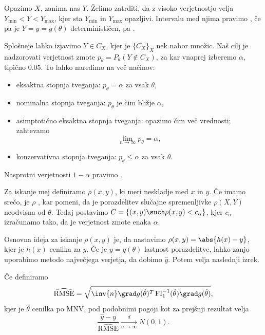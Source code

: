 
Opazimo $X$, zanima nas $Y$.
Želimo zatrditi, da z visoko verjetnostjo velja $Y_{\text{min}} < Y <
Y_{\text{max}}$, kjer sta $Y_{\text{min}}$ in $Y_{\text{max}}$ opazljivi.
Intervalu med njima pravimo , če pa je $Y = y =
g(\theta)$ determinističen, pa .

Splošneje lahko izjavimo $Y \in C_X$, kjer je $\{C_X\}_X$ nek nabor množic.
Naš cilj je nadzorovati verjetnost zmote $p_\theta = P_\theta(Y \notin C_X)$, za
kar vnaprej izberemo  $\alpha$, tipično $0.05$.
To lahko naredimo na več načinov:
\begin{itemize}
\item eksaktna stopnja tveganja: $p_\theta = \alpha$ za vsak $\theta$,
\item nominalna stopnja tveganja: $p_\theta$ je čim bližje $\alpha$,
\item asimptotično eksaktna stopnja tveganja: opazimo čim več vrednosti;
  zahtevamo
  \[
	\lim_{n \to \infty} p_\theta = \alpha,
  \]
\item konzervativna stopnja tveganja: $p_\theta \le \alpha$ za vsak $\theta$.
\end{itemize}
Nasprotni verjetnosti $1 - \alpha$ pravimo .


Za iskanje mej definiramo  $\rho(x,y)$, ki meri neskladje
med $x$ in $y$.
Če imamo srečo, je $\rho$ , kar pomeni, da je
porazdelitev slučajne spremenljivke $\rho(X,Y)$ neodvisna od $\theta$.
Tedaj postavimo $C = \{(x,y) \such \rho(x,y) < c_\alpha\}$, kjer $c_\alpha$
izračunamo tako, da je verjetnost zmote enaka $\alpha$.

Osnovna ideja za iskanje $\rho(x,y)$ je, da nastavimo $\rho(x,y) = \abs{h(x) -
  y}$, kjer je $h(x)$ cenilka za $y$.
Če je $y = g(\theta)$ lastnost porazdelitve, lahko zanjo uporabimo metodo
največjega verjetja, da dobimo $\hat{y}$.
Potem velja naslednji izrek.

\begin{izrek}
  Če definiramo
  \[
	\widehat{\text{RMSE}}
	= \sqrt{\inv{n} \grad g(\hat{\theta})^T
	  \operatorname{FI}_1^{-1}(\hat{\theta}) \grad g(\hat{\theta})},
  \]
  kjer je $\hat{\theta}$ cenilka po MNV, pod podobnimi pogoji kot za prejšnji
  rezultat velja
  \[
	\frac{\hat{y} - y}{\widehat{\text{RMSE}}}
	\xrightarrow[n \to \infty]{d} N(0,1).
  \]
\end{izrek}

